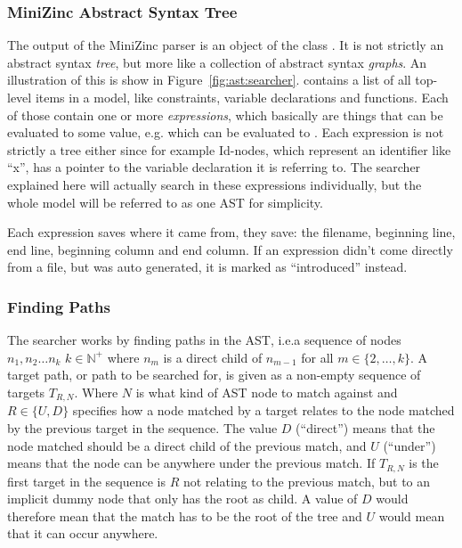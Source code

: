 \documentclass[a4paper,12pt]{article}
\newcommand{\elnaturale}{\mathbb{N}}
\newcommand{\mi}[1]{\mbox{\mzninline{#1}}}
\newcommand{\cpp}[1]{\mbox{\mznfont #1}}
\begin{document}
\subsubsection{MiniZinc Abstract Syntax Tree}


The output of the MiniZinc parser is an object of the class \mi{Model}. It is not strictly
an abstract syntax \emph{tree}, but more like a collection of abstract syntax
\emph{graphs}. An illustration of this is show in Figure~\ref{fig:ast:searcher}.
\mi{Model} contains a list of all top-level items in a model, like constraints, variable
declarations and functions. Each of those contain one or more \emph{expressions}, which
basically are things that can be evaluated to some value, e.g.\@ \mi{1+1} which can be
evaluated to \mi{2}. Each expression is not strictly a tree either since for example
\cpp{Id}-nodes, which represent an identifier like ``x'', has a pointer to the variable
declaration it is referring to. The searcher explained here will actually search in these
expressions individually, but the whole model will be referred to as one AST for
simplicity.

Each expression saves where it came from, they save: the filename, beginning line, end
line, beginning column and end column. If an expression didn't come directly from a file,
but was auto generated, it is marked as ``introduced'' instead.

\subsubsection{Finding Paths}\label{sec:paths}
The searcher works by finding paths in the AST, i.e.\@ a sequence of nodes
$n_1, n_2 \dots n_k$ $k \in \elnaturale^+$ where $n_m$ is a direct child of $n_{m-1}$ for
all $m \in \{2,\dots,k\}$. A target path, or path to be searched for, is given as a
non-empty sequence of targets $T_{R,N}$. Where $N$ is what kind of AST node to match
against and $R \in \{U,D\}$ specifies how a node matched by a target relates to the node
matched by the previous target in the sequence. The value $D$ (``direct'') means that the
node matched should be a direct child of the previous match, and $U$ (``under'') means
that the node can be anywhere under the previous match. If $T_{R,N}$ is the first target
in the sequence is $R$ not relating to the previous match, but to an implicit dummy node
that only has the root as child.
A value of $D$ would therefore mean that the match has to be the root of the tree and $U$ would mean
that it can occur anywhere.
\end{document}
